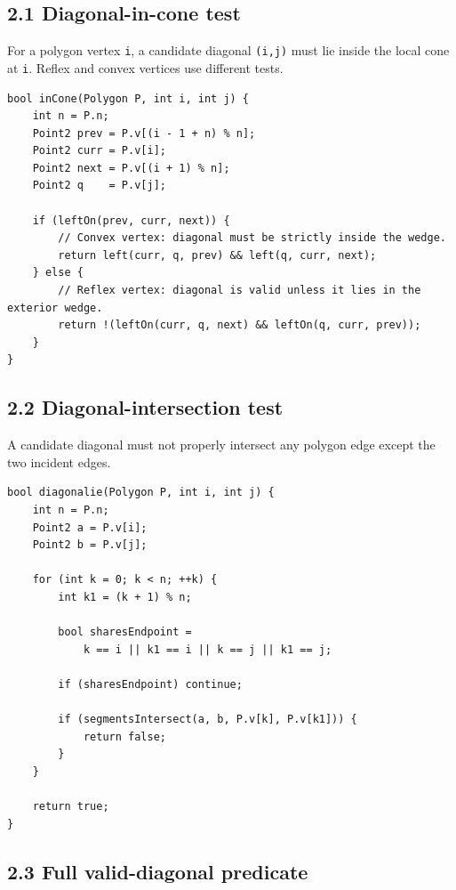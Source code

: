 \documentclass[11pt]{article}
\begin{document}
\subsection{2.1 Diagonal-in-cone test}\label{diagonal-in-cone-test}

For a polygon vertex \texttt{i}, a candidate diagonal
\texttt{(i,j)} must lie inside the local cone at
\texttt{i}. Reflex and convex vertices use different
tests.

\begin{verbatim}
bool inCone(Polygon P, int i, int j) {
    int n = P.n;
    Point2 prev = P.v[(i - 1 + n) % n];
    Point2 curr = P.v[i];
    Point2 next = P.v[(i + 1) % n];
    Point2 q    = P.v[j];

    if (leftOn(prev, curr, next)) {
        // Convex vertex: diagonal must be strictly inside the wedge.
        return left(curr, q, prev) && left(q, curr, next);
    } else {
        // Reflex vertex: diagonal is valid unless it lies in the exterior wedge.
        return !(leftOn(curr, q, next) && leftOn(q, curr, prev));
    }
}
\end{verbatim}

\subsection{2.2 Diagonal-intersection
test}\label{diagonal-intersection-test}

A candidate diagonal must not properly intersect any polygon edge except
the two incident edges.

\begin{verbatim}
bool diagonalie(Polygon P, int i, int j) {
    int n = P.n;
    Point2 a = P.v[i];
    Point2 b = P.v[j];

    for (int k = 0; k < n; ++k) {
        int k1 = (k + 1) % n;

        bool sharesEndpoint =
            k == i || k1 == i || k == j || k1 == j;

        if (sharesEndpoint) continue;

        if (segmentsIntersect(a, b, P.v[k], P.v[k1])) {
            return false;
        }
    }

    return true;
}
\end{verbatim}

\subsection{2.3 Full valid-diagonal
predicate}\label{full-valid-diagonal-predicate}
\end{document}
